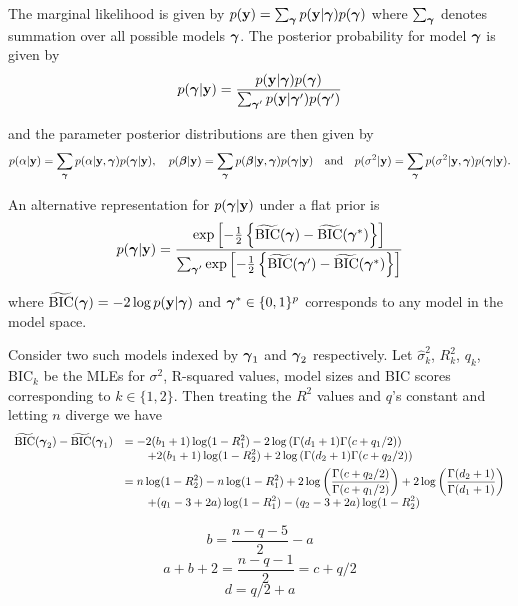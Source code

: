 \documentclass{article}[12pt]
\begin{document}
The marginal likelihood is given by
$p({\bf y}) = \sum_{{\boldsymbol \gamma}} p({\bf y}|{\boldsymbol \gamma})p({\boldsymbol \gamma})$
where $\sum_{{\boldsymbol \gamma}}$ denotes summation over all possible models ${\boldsymbol \gamma}$.
The posterior probability for model ${\boldsymbol \gamma}$ is given by
$$
\displaystyle p({\boldsymbol \gamma}|{\bf y}) = \frac{p({\bf y}|{\boldsymbol \gamma})p({\boldsymbol \gamma})}{\sum_{{\boldsymbol \gamma}'} p({\bf y}|{\boldsymbol \gamma}')p({\boldsymbol \gamma}')}
$$

\noindent and the parameter posterior distributions are then given by
$$
p(\alpha|{\bf y}) = \sum_{{\boldsymbol \gamma}} p(\alpha|{\bf y},{\boldsymbol \gamma})p({\boldsymbol \gamma}|{\bf y}),
\quad
p({\boldsymbol \beta}|{\bf y}) = \sum_{{\boldsymbol \gamma}} p({\boldsymbol \beta}|{\bf y},{\boldsymbol \gamma})p({\boldsymbol \gamma}|{\bf y}) 
\quad \mbox{and} \quad 
p(\sigma^2|{\bf y}) = \sum_{{\boldsymbol \gamma}} p(\sigma^2|{\bf y},{\boldsymbol \gamma})p({\boldsymbol \gamma}|{\bf y}). 
$$

\noindent An alternative representation for $p({\boldsymbol \gamma}|{\bf y})$ under a flat prior is
$$
\displaystyle p({\boldsymbol \gamma}|{\bf y}) = \frac{
\exp\left[
-\tfrac{1}{2} \left\{ 
\widetilde{\mbox{BIC}}({\boldsymbol \gamma}) - \widetilde{\mbox{BIC}}({\boldsymbol \gamma}^*) 
\right\} \right]
}{
\sum_{{\boldsymbol \gamma}'} \exp\left[
-\tfrac{1}{2} \left\{ \widetilde{\mbox{BIC}}({\boldsymbol \gamma}') - \widetilde{\mbox{BIC}}({\boldsymbol \gamma}^*) \right\} \right]
}
$$

\noindent where $\widetilde{\mbox{BIC}}({\boldsymbol \gamma}) = - 2\log p({\bf y}|{\boldsymbol \gamma})$ and
${\boldsymbol \gamma}^* \in \{0,1\}^p$ corresponds to any model in the model space.

Consider two such models indexed by $\vgamma_1$ and $\vgamma_2$ respectively.
Let $\widehat{\sigma}_k^2$, $R_k^2$, $q_k$, $\mbox{BIC}_k$ be the MLEs for $\sigma^2$, 
R-squared values, model sizes and BIC scores corresponding to $k\in\{1,2\}$.
Then treating the $R^2$ values and $q$'s constant and letting $n$ diverge we have
$$
\begin{array}{rl}
\widetilde{\mbox{BIC}}(\vgamma_2) - \widetilde{\mbox{BIC}}(\vgamma_1)
& \ds = 
- 2(b_1 + 1)\log(1 - R_1^2) 
- 2\log\left( \Gamma(d_1 + 1)\Gamma(c + q_1/2) \right)
\\
& \ds \qquad + 2(b_1 + 1)\log(1 - R_2^2) + 2\log\left( \Gamma(d_2 + 1)\Gamma(c + q_2/2) \right)
\\ [1ex]
& \ds = n\log(1 - R_2^2) - n\log(1 - R_1^2)  + 2\log\left( \frac{\Gamma(c + q_2/2
)}{\Gamma(c + q_1/2)} \right) 
+ 2\log\left( \frac{\Gamma(d_2 + 1)}{\Gamma(d_1 + 1)} \right)
 \\
& \ds \qquad + 
(q_1 - 3 + 2a)\log(1 - R_1^2) - (q_2 - 3 + 2a)\log(1 - R_2^2)

\end{array} 
$$

$$
b = \frac{n - q - 5}{2} - a
$$
$$
a + b + 2 = \frac{n - q - 1}{2} = c + q/2
$$
$$
d = q/2 + a
$$
\end{document}
